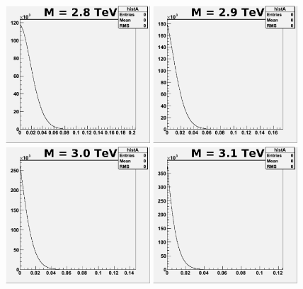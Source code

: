 \begin{figure}[!ht]
  \begin{center}
     \includegraphics[width=0.48\textwidth]{Figures/MCpost2800_6_pe0.pdf}
     \includegraphics[width=0.48\textwidth]{Figures/MCpost2900_6_pe0.pdf} 
     \includegraphics[width=0.48\textwidth]{Figures/MCpost3000_6_pe0.pdf}
     \includegraphics[width=0.48\textwidth]{Figures/MCpost3100_6_pe0.pdf}

\end{center}
\end{figure}
